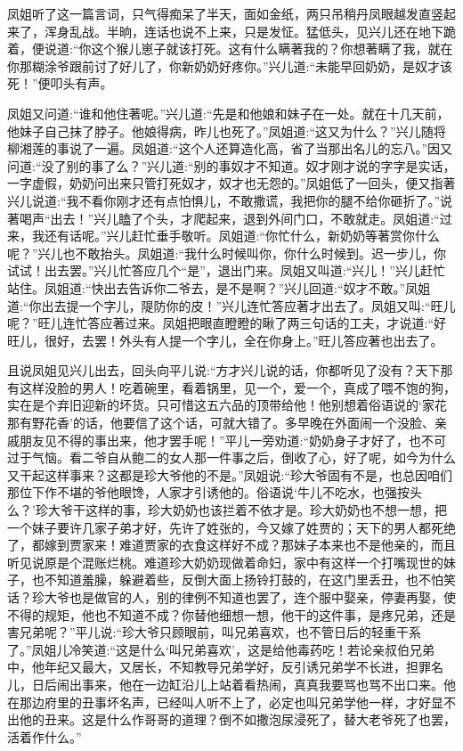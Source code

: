 \begin{parag}
    凤姐听了这一篇言词，只气得痴呆了半天，面如金纸，两只吊稍丹凤眼越发直竖起来了，浑身乱战。半晌，连话也说不上来，只是发怔。猛低头，见兴儿还在地下跪着，便说道:“你这个猴儿崽子就该打死。这有什么瞒著我的？你想著瞒了我，就在你那糊涂爷跟前讨了好儿了，你新奶奶好疼你。”兴儿道:“未能早回奶奶，是奴才该死！”便叩头有声。
\end{parag}


\begin{parag}
    凤姐又问道:“谁和他住著呢。”兴儿道:“先是和他娘和妹子在一处。就在十几天前，他妹子自己抹了脖子。他娘得病，昨儿也死了。”凤姐道:“这又为什么？”兴儿随将柳湘莲的事说了一遍。凤姐道:“这个人还算造化高，省了当那出名儿的忘八。”因又问道:“没了别的事了么？”兴儿道:“别的事奴才不知道。奴才刚才说的字字是实话，一字虚假，奶奶问出来只管打死奴才，奴才也无怨的。”凤姐低了一回头，便又指著兴儿说道:“我不看你刚才还有点怕惧儿，不敢撒谎，我把你的腿不给你砸折了。”说著喝声“出去！”兴儿瞌了个头，才爬起来，退到外间门口，不敢就走。凤姐道:“过来，我还有话呢。”兴儿赶忙垂手敬听。凤姐道:“你忙什么，新奶奶等著赏你什么呢？”兴儿也不敢抬头。凤姐道:“我什么时候叫你，你什么时候到。迟一步儿，你试试！出去罢。”兴儿忙答应几个“是”，退出门来。凤姐又叫道:“兴儿！”兴儿赶忙站住。凤姐道:“快出去告诉你二爷去，是不是啊？”兴儿回道:“奴才不敢。”凤姐道:“你出去提一个字儿，隄防你的皮！”兴儿连忙答应著才出去了。凤姐又叫:“旺儿呢？”旺儿连忙答应著过来。凤姐把眼直瞪瞪的瞅了两三句话的工夫，才说道:“好旺儿，很好，去罢！外头有人提一个字儿，全在你身上。”旺儿答应著也出去了。
\end{parag}


\begin{parag}
    且说凤姐见兴儿出去，回头向平儿说:“方才兴儿说的话，你都听见了没有？天下那有这样没脸的男人！吃着碗里，看着锅里，见一个，爱一个，真成了喂不饱的狗，实在是个弃旧迎新的坏货。只可惜这五六品的顶带给他！他别想着俗语说的‘家花那有野花香’的话，他要信了这个话，可就大错了。多早晚在外面闹一个没脸、亲戚朋友见不得的事出来，他才罢手呢！”平儿一旁劝道:“奶奶身子才好了，也不可过于气恼。看二爷自从鲍二的女人那一件事之后，倒收了心，好了呢，如今为什么又干起这样事来？这都是珍大爷他的不是。”凤姐说:“珍大爷固有不是，也总因咱们那位下作不堪的爷他眼馋，人家才引诱他的。俗语说‘牛儿不吃水，也强按头么？’珍大爷干这样的事，珍大奶奶也该拦着不依才是。珍大奶奶也不想一想，把一个妹子要许几家子弟才好，先许了姓张的，今又嫁了姓贾的；天下的男人都死绝了，都嫁到贾家来！难道贾家的衣食这样好不成？那妹子本来也不是他亲的，而且听见说原是个混账烂桃。难道珍大奶奶现做着命妇，家中有这样一个打嘴现世的妹子，也不知道羞臊，躲避着些，反倒大面上扬铃打鼓的，在这门里丢丑，也不怕笑话？珍大爷也是做官的人，别的律例不知道也罢了，连个服中娶亲，停妻再娶，使不得的规矩，他也不知道不成？你替他细想一想，他干的这件事，是疼兄弟，还是害兄弟呢？”平儿说:“珍大爷只顾眼前，叫兄弟喜欢，也不管日后的轻重干系了。”凤姐儿冷笑道:“这是什么‘叫兄弟喜欢’，这是给他毒药吃！若论亲叔伯兄弟中，他年纪又最大，又居长，不知教导兄弟学好，反引诱兄弟学不长进，担罪名儿，日后闹出事来，他在一边缸沿儿上站着看热闹，真真我要骂也骂不出口来。他在那边府里的丑事坏名声，已经叫人听不上了，必定也叫兄弟学他一样，才好显不出他的丑来。这是什么作哥哥的道理？倒不如撒泡尿浸死了，替大老爷死了也罢，活着作什么。”
\end{parag}


